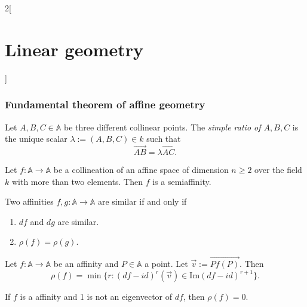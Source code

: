 \documentclass[class=article,10pt,crop=false]{standalone}
\begin{document}
\begin{multicols}{2}[\section{Linear geometry}]
\subsubsection*{Fundamental theorem of affine geometry}
\begin{definition}
Let $A,B,C\in\mathbb{A}$ be three different collinear points. The \textit{simple ratio of $A,B,C$} is the unique scalar $\lambda:=(A,B,C)\in k$ such that $$\overrightarrow{AB}=\lambda\overrightarrow{AC}.$$
\begin{theorem}
Let $f:\mathbb{A}\rightarrow\mathbb{A}$ be a collineation of an affine space of dimension $n\geq 2$ over the field $k$ with more than two elements. Then $f$ is a semiaffinity.
\end{theorem}
\begin{prop}
Two affinities $f,g:\mathbb{A}\rightarrow\mathbb{A}$ are similar if and only if
\begin{enumerate}
    \item $df$ and $dg$ are similar.
    \item $\rho(f)=\rho(g)$.
\end{enumerate}
\end{prop}
\begin{theorem}
Let $f:\mathbb{A}\rightarrow\mathbb{A}$ be an affinity and $P\in\mathbb{A}$ a point. Let $\overrightarrow{v}:=\overrightarrow{Pf(P)}$. Then $$\rho(f)=\min\{r:(df-id)^r(\overrightarrow{v})\in\text{Im}(df-id)^{r+1}\}.$$
\end{theorem}
\begin{corollary}
If $f$ is a affinity and 1 is not an eigenvector of $df$, then $\rho(f)=0$.
\end{corollary}
\end{definition}

\end{multicols}
\end{document}
